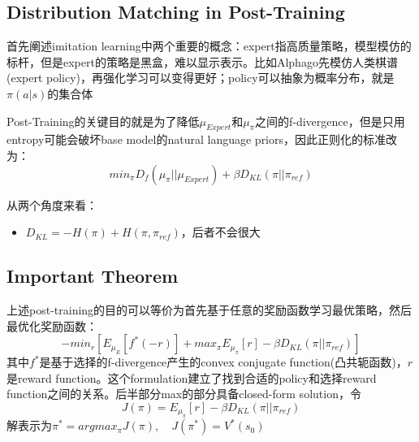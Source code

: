 \documentclass[a4paper,12pt]{article}
\begin{document}
\subsection{Distribution Matching in Post-Training}
首先阐述imitation learning中两个重要的概念：expert指高质量策略，模型模仿的标杆，但是expert的策略是黑盒，难以显示表示。比如Alphago先模仿人类棋谱(expert policy)，再强化学习可以变得更好；policy可以抽象为概率分布，就是$\pi(a|s)$的集合体

Post-Training的关键目的就是为了降低$\mu_{Expert}$和$\mu_{\pi}$之间的f-divergence，但是只用entropy可能会破坏base model的natural language priors，因此正则化的标准改为：
\[
    min_{\pi} D_f(\mu_{\pi}||\mu_{Expert}) + \beta D_{KL}(\pi||\pi_{ref})
\]

从两个角度来看：
\begin{itemize}
    \item $D_{KL} = -H(\pi) + H(\pi, \pi_{ref})$，后者不会很大
\end{itemize}

\subsection{Important Theorem}
上述post-training的目的可以等价为首先基于任意的奖励函数学习最优策略，然后最优化奖励函数：
\[
    -min_r[E_{\mu_E}[f^*(-r)] + max_{\pi}E_{\mu_{\pi}}[r] - \beta D_{KL}(\pi||\pi_{ref})]
\]
其中$f^*$是基于选择的f-divergence产生的convex conjugate function(凸共轭函数)，$r$是reward function。这个formulation建立了找到合适的policy和选择reward function之间的关系。后半部分max的部分具备closed-form solution，令
\[
    J(\pi) = E_{\mu_{\pi}}[r] - \beta D_{KL}(\pi||\pi_{ref})
\]
解表示为$\pi^* = arg max_{\pi}J(\pi), \quad J(\pi^*) = V^*(s_0)$
\end{document}
